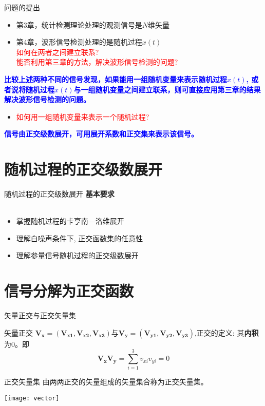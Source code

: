 \begin{frame}{问题的提出}
\begin{itemize}
\item 第3章，统计检测理论处理的观测信号是$N$维矢量
\item 第4章，波形信号检测处理的是随机过程$x(t)$\\
\textcolor{red}{如何在两者之间建立联系?}\\
\textcolor{red}{能否利用第三章的方法，解决波形信号检测的问题?}
\end{itemize}
\textbf{\textcolor{blue}{比较上述两种不同的信号发现，如果能用一组随机变量来表示随机过程$x(t)$,  或者说将随机过程$x(t)$与一组随机变量之间建立联系，则可直接应用第三章的结果解决波形信号检测的问题。}}
\begin{itemize}
\item \textcolor{red}{如何用一组随机变量来表示一个随机过程?}
\end{itemize}
\textbf{\textcolor{blue}{信号由正交级数展开，可用展开系数和正交集来表示该信号。}}
\end{frame}

\section{随机过程的正交级数展开}

\begin{frame}{随机过程的正交级数展开}
\textbf{基本要求}\\
~\\
\begin{itemize}
	\setlength{\itemsep}{.5cm}
	\item 掌握随机过程的卡亨南---洛维展开
	\item 理解白噪声条件下, 正交函数集的任意性
	\item 理解参量信号随机过程的正交级数展开
\end{itemize}
\end{frame}

\section{信号分解为正交函数}

\begin{frame}{矢量正交与正交矢量集}
\begin{block}{矢量正交}
	$\bm{V_x=(V_{x1},V_{x2},V_{x3})}$与$\bm{V_y=(V_{y1},V_{y2},V_{y3})}$,正交的定义: 其\textbf{内积}为0。即
	\[\bm{V_xV_y}=\sum_{i=1}^{3}v_{xi}v_{yi}=0 \]
\end{block}
\begin{block}{正交矢量集}
	由两两正交的矢量组成的矢量集合称为正交矢量集。
\end{block}
\centering
\texttt{[image: vector]}
\end{frame}

